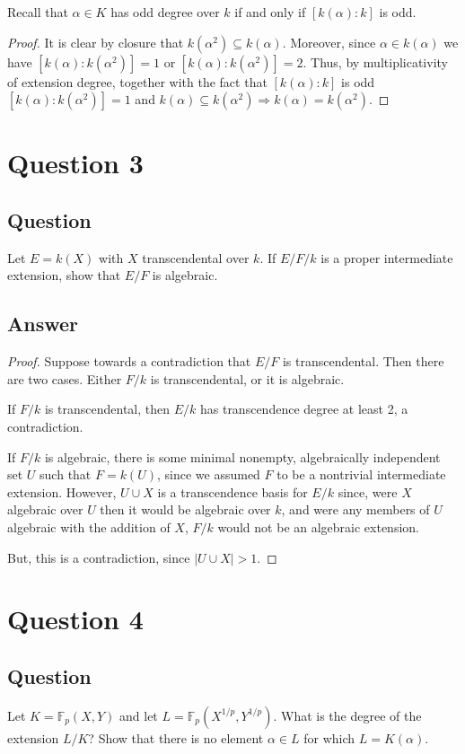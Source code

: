 \documentclass[11pt]{article}
\begin{document}
Recall that $\alpha \in K$ has odd degree over $k$ if and only if $[k(\alpha):k]$ is odd.
\begin{proof}
It is clear by closure that $k(\alpha^2) \subseteq k(\alpha)$. Moreover, since $\alpha \in k(\alpha)$ we have $[k(\alpha): k(\alpha^2)]=1$ or $[k(\alpha): k(\alpha^2)]=2$. Thus, by multiplicativity of extension degree, together with the fact that $[k(\alpha):k]$ is odd  $[k(\alpha): k(\alpha^2)]=1$ and $k(\alpha) \subseteq k(\alpha^2) \Rightarrow k(\alpha)=k(\alpha^2)$.
\end{proof}

\section{Question 3}
\subsection{Question}
Let $E = k(X)$ with $X$ transcendental over $k$. If $E/F/k$ is a proper intermediate extension, show that $E/F$ is algebraic.
\subsection{Answer}
\begin{proof}
Suppose towards a contradiction that $E/F$ is transcendental. Then there are two cases. Either $F/k$ is transcendental, or it is algebraic. 

If $F/k$ is transcendental, then $E/k$ has transcendence degree at least 2, a contradiction.

If $F/k$ is algebraic, there is some minimal nonempty, algebraically independent  set $U$ such that $F = k(U)$, since we assumed $F$ to be a nontrivial intermediate extension.   However, $U \cup X $ is a transcendence basis for $E/k$ since, were $X$ algebraic over $U$ then it would be algebraic over $k$, and were any members of $U$ algebraic with the addition of $X$, $F/k$ would not be an algebraic extension.

But, this is a contradiction, since $|U \cup X| > 1$.
\end{proof}

\section{Question 4}
\subsection{Question}
Let $K=\mathbb{F}_p(X,Y)$ and let $L=\mathbb{F}_p(X^{1/p}, Y^{1/p})$. What is the degree of the extension $L/K$? Show that there is no element $\alpha \in L$ for which $L=K(\alpha)$.
\end{document}
